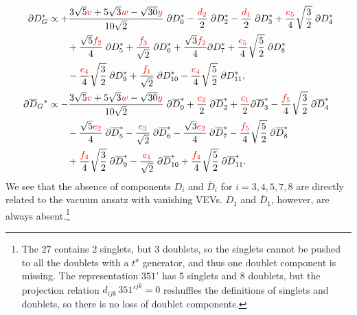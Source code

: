 \documentclass[a4paper,12pt]{article}
\def\RED{\textcolor{red}}
\begin{document}
\begin{align}
\partial D_{G}^\ast&\propto
+\frac{3 \sqrt{5} \RED{v}+5 \sqrt{3} \RED{w}-\sqrt{30} \RED{y}}{10 \sqrt{2}} \;\partial D_{0}^\ast
-\frac{\RED{d_2}}{2} \;\partial D_{2}^\ast
-\frac{\RED{d_1}}{2} \;\partial D_{3}^\ast
+\frac{\RED{e_5}}{4} \sqrt{\frac{3}{2}} \;\partial D_{4}^\ast\nonumber\\
&\qquad +\frac{\sqrt{5} \RED{f_2}}{4} \;\partial D_{5}^\ast
+\frac{\RED{f_3}}{\sqrt{2}} \;\partial D_{6}^\ast
+\frac{\sqrt{3} \RED{f_2}}{4} \partial D_{7}^\ast
+\frac{\RED{e_5}}{4} \sqrt{\frac{5}{2}} \;\partial D_{8}^\ast\nonumber\\
&\qquad -\frac{\RED{e_4}}{4} \sqrt{\frac{3}{2}} \;\partial D_{9}^\ast
+\frac{\RED{f_1}}{\sqrt{2}} \;\partial D_{10}^\ast
-\frac{\RED{e_4}}{4} \sqrt{\frac{5}{2}} \;\partial D_{11}^\ast,\label{equation:Goldstone1}\\
\partial \overline{D}_{G}{}^\ast&\propto
-\frac{3 \sqrt{5} \RED{v}+5 \sqrt{3} \RED{w}-\sqrt{30} \RED{y}}{10 \sqrt{2}} \;\partial \overline{D}_{0}^\ast
+\frac{\RED{c_2}}{2} \;\partial \overline{D}_{2}^\ast
+\frac{\RED{c_1}}{2} \partial \overline{D}_{3}^\ast
-\frac{\RED{f_5}}{4} \sqrt{\frac{3}{2}} \;\partial \overline{D}_{4}^\ast\nonumber\\
&\qquad -\frac{\sqrt{5} \RED{e_2}}{4} \;\partial \overline{D}_{5}^\ast
-\frac{\RED{e_3}}{\sqrt{2}} \;\partial \overline{D}_{6}^\ast
-\frac{\sqrt{3} \RED{e_2}}{4} \;\partial \overline{D}_{7}^\ast
-\frac{\RED{f_5}}{4} \sqrt{\frac{5}{2}} \;\partial \overline{D}_{8}^\ast\nonumber\\
&\qquad +\frac{\RED{f_4}}{4} \sqrt{\frac{3}{2}} \;\partial \overline{D}_{9}^\ast
-\frac{\RED{e_1}}{\sqrt{2}} \;\partial \overline{D}_{10}^\ast
+ \frac{\RED{f_4}}{4} \sqrt{\frac{5}{2}} \;\partial \overline{D}_{11}^\ast.\label{equation:Goldstone2}
\end{align}
We see that the absence of components $D_i$ and $\overline{D}_i$ for $i=3,4,5,7,8$ are directly related to the vacuum ansatz with vanishing VEVs. $D_1$ and $\overline{D}_1$, however, are always absent.\footnote{The $27$ contains $2$ singlets, but $3$ doublets, so the singlets cannot be pushed to all the doublets with a $t^a$ generator, and thus one doublet component is missing. The representation $351'$ has $5$ singlets and $8$ doublets, but the projection relation $d_{ijk}\,351'^{jk}=0$ reshuffles the definitions of singlets and doublets, so there is no loss of doublet components.}
\end{document}
